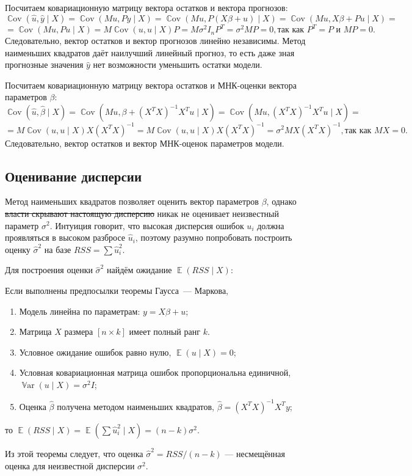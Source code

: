 \documentclass[12pt]{article}
\DeclareMathOperator{\Cov}{\mathbb{C}ov}
\DeclareMathOperator{\Var}{\mathbb{V}ar}
\DeclareMathOperator{\E}{\mathbb{E}}
\renewcommand{\b}{\beta}
\newcommand{\hb}{\hat{\beta}}
\renewcommand{\u}{u}
\newcommand{\hu}{\hat{u}}
\newcommand{\hy}{\hat{y}}
\newcommand{\RSS}{RSS}
\newcommand{\gaussmarkov}{
\begin{enumerate}[label=\arabic*.]
    \item Модель линейна по параметрам: $y = X\b + u$;
    \item Матрица $X$ размера $[n \times k]$ имеет полный ранг $k$.
    \item Условное ожидание ошибок равно нулю, $\E(\u \mid X) = 0$;
    \item Условная ковариационная матрица ошибок пропорциональна единичной, $\Var(\u \mid X) = \sigma^2 I$;
    \item Оценка $\hb$ получена методом наименьших квадратов, $\hb = (X^T X)^{-1}X^T y$;
\end{enumerate}}
\begin{document}
Посчитаем ковариационную матрицу вектора остатков и вектора прогнозов:
\[
\Cov(\hu, \hy \mid X) = \Cov(M\u, Py \mid X) = \Cov(M\u, P(X\b + u) \mid X) = \Cov(M\u, X\b + Pu \mid X) =
\]
\[
=\Cov(Mu, Pu \mid X) = M \Cov(u,u \mid X) P = M \sigma^2I_n P^{T} = \sigma^2MP = 0, \text{так как } P^{T} = P \text{ и } MP = 0.
\]
Следовательно, вектор остатков и вектор прогнозов линейно независимы. Метод наименьших квадратов даёт наилучший линейный прогноз, то есть даже зная прогнозные значения $\hy$ нет возможности уменьшить остатки модели.

Посчитаем ковариационную матрицу вектора остатков и МНК-оценки вектора параметров $\b$:
\[
\Cov(\hu, \hb \mid X) = \Cov(M\u, \b + (X^{T}X)^{-1}X^{T}u \mid X) = \Cov(Mu,(X^{T}X)^{-1}X^{T}u \mid X) = 
\]
\[
=M\Cov(u, u \mid X) X(X^{T}X)^{-1} = M\Cov(u,u \mid X) X(X^{T}X)^{-1} = \sigma^2 MX(X^{T}X)^{-1}, \text{так как } MX = 0.
\]
Следовательно, вектор остатков и вектор МНК-оценок параметров модели.

\subsection{Оценивание дисперсии}

Метод наименьших квадратов позволяет оценить вектор параметров $\beta$, однако \sout{власти скрывают настоящую дисперсию} никак не оценивает неизвестный параметр $\sigma^2$.
Интуиция говорит, что высокая дисперсия ошибок $u_i$ должна проявляться в высоком разбросе $\hat u_i$, поэтому разумно попробовать построить оценку $\hat\sigma^2$ на базе $\RSS = \sum \hat u_i^2$.

Для построения оценки $\hat\sigma^2$ найдём ожидание $\E(\RSS \mid X)$:
\begin{theorem}
Если выполнены предпосылки теоремы Гаусса~— Маркова, 
\gaussmarkov
то $\E(\RSS \mid X) = \E(\sum \hu_i^2 \mid X) = (n - k) \sigma^2$.
\end{theorem}
Из этой теоремы следует, что оценка $\hat \sigma^2 = \RSS/ (n - k)$ — несмещённая оценка для неизвестной дисперсии $\sigma^2$.
\end{document}
